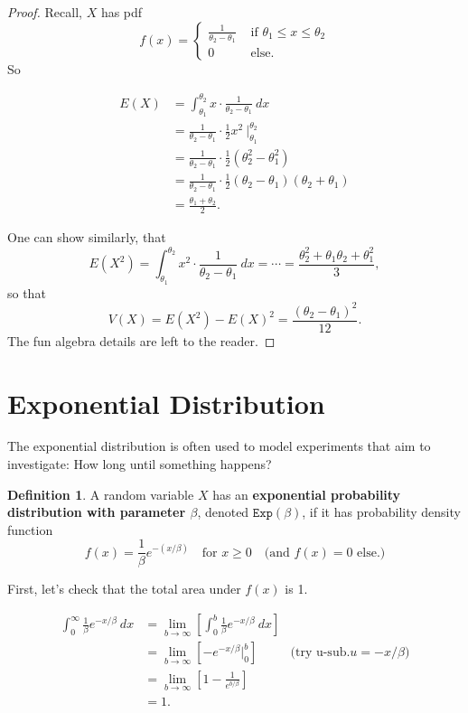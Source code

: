 \documentclass[
]{book}
\theoremstyle{definition}
\newtheorem{definition}{Definition}[chapter]
\theoremstyle{definition}
\theoremstyle{definition}
\theoremstyle{definition}
\theoremstyle{remark}
\begin{document}
\begin{proof}
Recall, \(X\) has pdf
\[
f(x)=
\begin{cases}
\frac{1}{\theta_2 - \theta_1} &\text{ if }\theta_1 \leq x \leq \theta_2 \\
0 &\text{ else.} 
\end{cases}
\]
So

\begin{align*}
E(X) &= \int_{\theta_1}^{\theta_2} x \cdot \frac{1}{\theta_2-\theta_1}~dx\\
      &= \frac{1}{\theta_2-\theta_1} \cdot \frac{1}{2}x^2 ~\biggr|_{\theta_1}^{\theta_2}\\
      &= \frac{1}{\theta_2-\theta_1} \cdot \frac{1}{2}(\theta_2^2-\theta_1^2) \\
      &= \frac{1}{\theta_2-\theta_1} \cdot \frac{1}{2}(\theta_2-\theta_1)(\theta_2+\theta_1) \\
      &= \frac{\theta_1+\theta_2}{2}.
\end{align*}

One can show similarly, that \[E(X^2) = \int_{\theta_1}^{\theta_2} x^2 \cdot \frac{1}{\theta_2-\theta_1}~dx = \cdots =  \frac{\theta_2^2 + \theta_1\theta_2 + \theta_1^2}{3},\]
so that \[V(X) = E(X^2) - E(X)^2 = \frac{(\theta_2-\theta_1)^2}{12}.\] The fun algebra details are left to the reader.
\end{proof}

\section{Exponential Distribution}\label{exponential-distribution}

The exponential distribution is often used to model experiments that aim to investigate: How long until something happens?

\begin{definition}
\protect\hypertarget{def:exp-distribution}{}\label{def:exp-distribution}A random variable \(X\) has an \textbf{exponential probability distribution with parameter \(\beta\)}, denoted \(\texttt{Exp}(\beta)\), if it has probability density function
\[
f(x)=
\frac{1}{\beta}e^{-(x/\beta)} ~~~ \text{ for }x \geq 0~~~ \text{ (and }f(x) = 0\text{ else.)}
\]
\end{definition}

First, let's check that the total area under \(f(x)\) is 1.

\begin{align*}
\int_0^\infty \frac{1}{\beta}e^{-x/\beta}~dx &= \lim_{b\to\infty}\left[\int_0^b \frac{1}{\beta}e^{-x/\beta}~dx\right] \\
&= \lim_{b\to\infty}\left[-e^{-x/\beta}\biggr|_0^b \right] & \text{(try u-sub.} u=-x/\beta) \\
&= \lim_{b \to \infty}\left[1 - \frac{1}{e^{b/\beta}}\right]\\
&= 1.
\end{align*}
\end{document}
